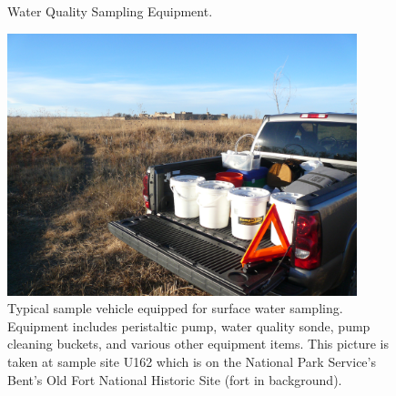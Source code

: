 \begin{figure}[htbp]
	\centering
	\hspace{4em}%
	\caption[Water Quality Sampling Equipment.]{Water Quality Sampling Equipment.}
	\label{fig:WQEquipment}
\end{figure}

\begin{figure}
	\centering
	\includegraphics[width=4in]{Figures/Photo/SampleVehicle}
	\caption[Typical sample vehicle equipped for surface water sampling.]{Typical sample vehicle equipped for surface water sampling.  Equipment includes peristaltic pump, water quality sonde, pump cleaning buckets, and various other equipment items.  This picture is taken at sample site U162 which is on the National Park Service's Bent's Old Fort National Historic Site (fort in background).}
	\label{pic:SampleVehicle}
\end{figure}	

